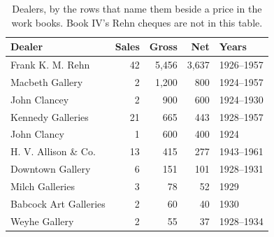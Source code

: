 \begin{table}[htbp]\centering\small
\caption{Dealers, by the rows that name them beside a price in the work books. Book IV's Rehn cheques are not in this table.}\label{tab:dealers}
\begin{tabular}{lrrrl}\toprule Dealer & Sales & Gross & Net & Years\\\midrule
Frank K. M. Rehn & 42 & 5,456 & 3,637 & 1926--1957\\
Macbeth Gallery & 2 & 1,200 & 800 & 1924--1957\\
John Clancey & 2 & 900 & 600 & 1924--1930\\
Kennedy Galleries & 21 & 665 & 443 & 1928--1957\\
John Clancy & 1 & 600 & 400 & 1924\\
H. V. Allison \& Co. & 13 & 415 & 277 & 1943--1961\\
Downtown Gallery & 6 & 151 & 101 & 1928--1931\\
Milch Galleries & 3 & 78 & 52 & 1929\\
Babcock Art Galleries & 2 & 60 & 40 & 1930\\
Weyhe Gallery & 2 & 55 & 37 & 1928--1934\\
\bottomrule\end{tabular}\end{table}

